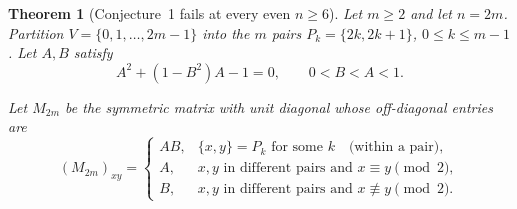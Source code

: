 \documentclass[11pt]{article}
\theoremstyle{plain}
\newtheorem{theorem}{Theorem}[section]
\theoremstyle{definition}
\begin{document}
\begin{aiblock}

\begin{theorem}[Conjecture~1 fails at every even $n\ge6$]\label{thm:M2m}
Let $m\ge2$ and let $n=2m$. Partition $V=\{0,1,\dots,2m-1\}$ into the $m$ \emph{pairs}
$P_k=\{2k,2k+1\}$, $0\le k\le m-1$. Let $A, B$ satisfy
\begin{equation}\label{eq:curve}
A^2+(1-B^2)A-1=0,\qquad 0<B<A<1 .
\end{equation}

Let $M_{2m}$ be the symmetric matrix with unit diagonal whose off-diagonal entries are \[ (M_{2m})_{xy}= \begin{cases} AB, & \{x,y\}=P_k \text{ for some } k \quad\text{(within a pair)},\\ A, & x,y \text{ in different pairs and } x\equiv y \pmod 2,\\ B, & x,y \text{ in different pairs and } x\not\equiv y \pmod 2 . \end{cases} \]


\end{theorem}
\end{aiblock}
\end{document}
